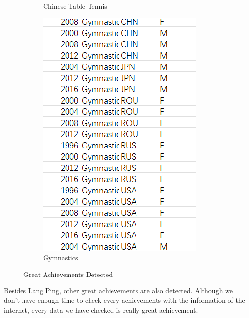 \begin{figure}[h]
\begin{subfigure}[b]{0.32\textwidth}
        \caption{Chinese Table Tennis}
        \label{fig:chn_tt}
    \end{subfigure}
    \begin{subfigure}[b]{0.32\textwidth}
        \centering
        \includegraphics[width=\textwidth]{../figures/gym.png}
        \caption{Gymnastics}
        \label{fig:gym}
    \end{subfigure}
    \caption{Great Achievements Detected}
    \label{fig:lang_ping_combined}
\end{figure}

Besides Lang Ping, other great achievements are also detected. Although we don't have enough time to check every achievements with the information of the internet, every data we have checked is really great achievement.

